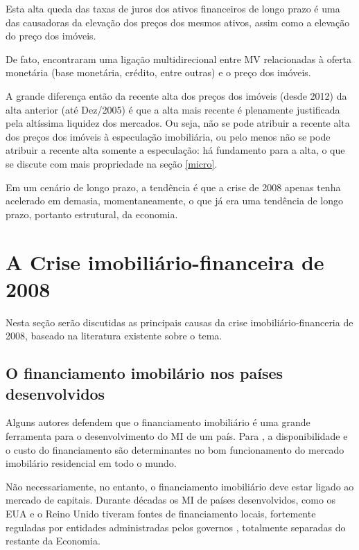 \documentclass[
	12pt,				%
	oneside,			%
	a4paper,			%
	chapter=TITLE,		%
	section=TITLE,		%
	english,			%
	brazil				%
	]{abntex2}
\begin{document}
\begin{refsection}
Esta alta queda das taxas de juros dos ativos financeiros de longo prazo é uma
das causadoras da elevação dos preços dos mesmos ativos, assim como a elevação
do preço dos imóveis.

De fato, \textcite{goodhart2008} encontraram uma ligação multidirecional entre \gls{MV}
relacionadas à oferta monetária (base monetária, crédito, entre outras) e o
preço dos imóveis.

A grande diferença então da recente alta dos preços dos imóveis (desde 2012) da
alta anterior (até Dez/2005) é que a alta mais recente é plenamente justificada
pela altíssima liquidez dos mercados. Ou seja, não se pode atribuir a recente
alta dos preços dos imóveis à especulação imobiliária, ou pelo menos não se pode
atribuir a recente alta somente a especulação: há fundamento para a alta, o que
se discute com mais propriedade na seção \ref{micro}.

Em um cenário de longo prazo, a tendência é que a crise de 2008 apenas tenha
acelerado em demasia, momentaneamente, o que já era uma tendência de longo
prazo, portanto estrutural, da economia.

\hypertarget{a-crise-imobiliuxe1rio-financeira-de-2008}{%
\section{A Crise imobiliário-financeira de 2008}\label{a-crise-imobiliuxe1rio-financeira-de-2008}}

Nesta seção serão discutidas as principais causas da crise
imobiliário-financeria de 2008, baseado na literatura existente sobre o tema.

\hypertarget{o-financiamento-imobiluxe1rio-nos-pauxedses-desenvolvidos}{%
\subsection{O financiamento imobilário nos países desenvolvidos}\label{o-financiamento-imobiluxe1rio-nos-pauxedses-desenvolvidos}}

Alguns autores defendem que o financiamento imobiliário é uma grande ferramenta
para o desenvolvimento do \gls{MI} de um país. Para \textcite[p.~21]{green}, a
disponibilidade e o custo do financiamento são determinantes no bom
funcionamento do mercado imobilário residencial em todo o mundo.

Não necessariamente, no entanto, o financiamento imobiliário deve estar ligado
ao mercado de capitais. Durante décadas os \gls{MI} de países desenvolvidos,
como os EUA e o Reino Unido tiveram fontes de financiamento locais, fortemente
reguladas por entidades administradas pelos governos \autocite[p.~23]{green}, totalmente
separadas do restante da Economia.


\end{refsection}
\end{document}
